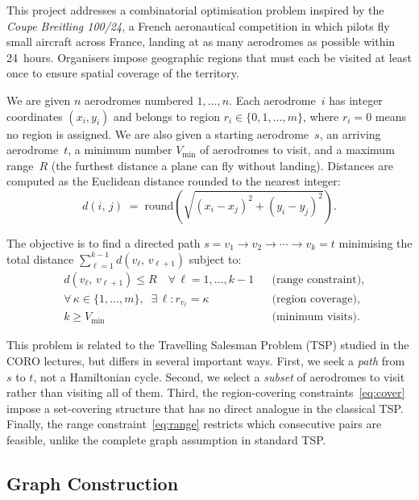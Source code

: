 \documentclass[12pt, a4paper]{article}
\newcommand{\dist}[2]{d(#1,\,#2)}
\begin{document}
This project addresses a combinatorial optimisation problem inspired by the
\textit{Coupe Breitling 100/24}, a French aeronautical competition in which pilots
fly small aircraft across France, landing at as many aerodromes as possible within
24~hours. Organisers impose geographic regions that must each be visited at least once
to ensure spatial coverage of the territory.

We are given $n$ aerodromes numbered $1,\ldots,n$. Each aerodrome~$i$ has integer
coordinates $(x_i, y_i)$ and belongs to region $r_i \in \{0,1,\ldots,m\}$, where
$r_i = 0$ means no region is assigned. We are also given a starting aerodrome~$s$,
an arriving aerodrome~$t$, a minimum number $V_{\min}$ of aerodromes to visit, and a
maximum range~$R$ (the furthest distance a plane can fly without landing).
Distances are computed as the Euclidean distance rounded to the nearest integer:
\[
  \dist{i}{j} \;=\; \mathrm{round}\!\left(\sqrt{(x_i - x_j)^2 + (y_i - y_j)^2}\right).
\]

The objective is to find a directed path $s = v_1 \to v_2 \to \cdots \to v_k = t$
minimising the total distance $\sum_{\ell=1}^{k-1} \dist{v_\ell}{v_{\ell+1}}$
subject to:
\begin{align}
  &\dist{v_\ell}{v_{\ell+1}} \leq R
    \quad \forall\,\ell = 1,\ldots,k{-}1
    && \text{(range constraint)}, \label{eq:range}\\[2pt]
  &\forall\,\kappa \in \{1,\ldots,m\},\;\;
    \exists\,\ell : r_{v_\ell} = \kappa
    && \text{(region coverage)}, \label{eq:cover}\\[2pt]
  &k \geq V_{\min}
    && \text{(minimum visits)}. \label{eq:card}
\end{align}

This problem is related to the Travelling Salesman Problem (TSP) studied in the CORO
lectures, but differs in several important ways. First, we seek a \emph{path} from $s$
to $t$, not a Hamiltonian cycle. Second, we select a \emph{subset} of aerodromes to
visit rather than visiting all of them. Third, the region-covering
constraints~\eqref{eq:cover} impose a set-covering structure that has no direct
analogue in the classical TSP. Finally, the range constraint~\eqref{eq:range}
restricts which consecutive pairs are feasible, unlike the complete graph assumption
in standard TSP.

\subsection{Graph Construction}
\end{document}
